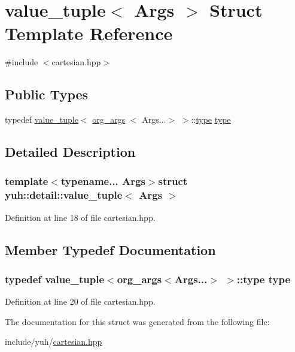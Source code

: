\hypertarget{structyuh_1_1detail_1_1value__tuple}{\section{value\-\_\-tuple$<$ \-Args $>$ \-Struct \-Template \-Reference}
\label{db/d49/structyuh_1_1detail_1_1value__tuple}
}


{\ttfamily \#include $<$cartesian.\-hpp$>$}

\subsection*{\-Public \-Types}
\begin{DoxyCompactItemize}
\item 
typedef \hyperlink{structyuh_1_1detail_1_1value__tuple}{value\-\_\-tuple}$<$ \hyperlink{structyuh_1_1detail_1_1org__args}{org\-\_\-args}\*
$<$ \-Args...$>$ $>$\-::\hyperlink{structyuh_1_1detail_1_1value__tuple_ade596f458a83e29f5596fab215bd84cb}{type} \hyperlink{structyuh_1_1detail_1_1value__tuple_ade596f458a83e29f5596fab215bd84cb}{type}
\end{DoxyCompactItemize}


\subsection{\-Detailed \-Description}
\subsubsection*{template$<$typename... \-Args$>$struct yuh\-::detail\-::value\-\_\-tuple$<$ Args $>$}



\-Definition at line 18 of file cartesian.\-hpp.



\subsection{\-Member \-Typedef \-Documentation}
\hypertarget{structyuh_1_1detail_1_1value__tuple_ade596f458a83e29f5596fab215bd84cb}{
\subsubsection[{type}]{\setlength{\rightskip}{0pt plus 5cm}typedef {\bf value\-\_\-tuple}$<${\bf org\-\_\-args}$<$\-Args...$>$ $>$\-::{\bf type} {\bf type}}}\label{db/d49/structyuh_1_1detail_1_1value__tuple_ade596f458a83e29f5596fab215bd84cb}


\-Definition at line 20 of file cartesian.\-hpp.



\-The documentation for this struct was generated from the following file\-:\begin{DoxyCompactItemize}
\item 
include/yuh/\hyperlink{cartesian_8hpp}{cartesian.\-hpp}\end{DoxyCompactItemize}

